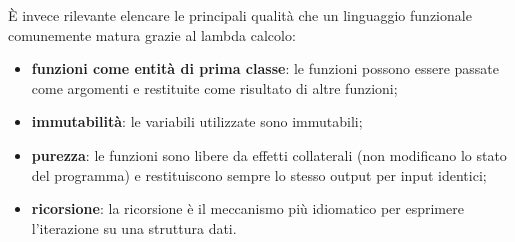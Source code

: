 \noindent È invece rilevante elencare le principali qualità che un linguaggio funzionale comunemente matura
grazie al lambda calcolo:
\begin{itemize}
    \item \textbf{funzioni come entità di prima classe}: le funzioni possono essere passate come argomenti
          e restituite come risultato di altre funzioni;
    \item \textbf{immutabilità}: le variabili utilizzate sono immutabili;
    \item \textbf{purezza}: le funzioni sono libere da effetti collaterali
          (non modificano lo stato del programma) e restituiscono sempre lo stesso output per input identici;
    \item \textbf{ricorsione}: la ricorsione è il meccanismo più idiomatico per esprimere
          l'iterazione su una struttura dati.
\end{itemize}